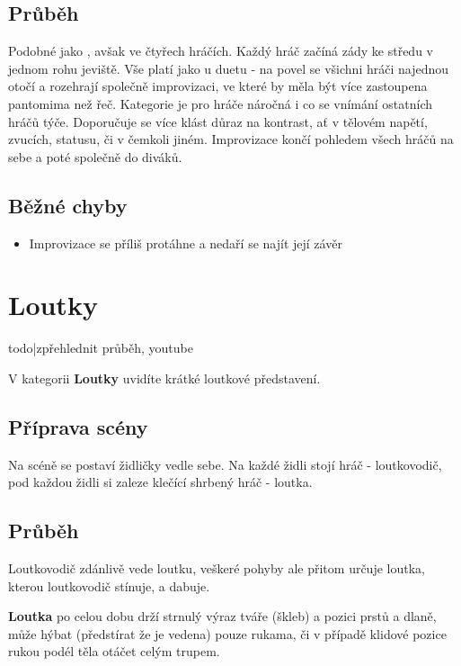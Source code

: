  
\subsection{Průběh}  
Podobné jako , avšak ve čtyřech hráčích. Každý hráč začíná zády ke středu v jednom rohu jeviště. Vše platí jako u duetu - na povel  se všichni hráči najednou otočí a rozehrají společně improvizaci, ve které by měla být více zastoupena pantomima než řeč. Kategorie je pro hráče náročná i co se vnímání ostatních hráčů týče. Doporučuje se více klást důraz na kontrast, ať v tělovém napětí, zvucích, statusu, či v čemkoli jiném. Improvizace končí pohledem všech hráčů na sebe a poté společně do diváků. 
 
\subsection{ Běžné chyby } \begin{itemize}
\item Improvizace se příliš protáhne a nedaří se najít její závěr
\end{itemize}
 
 
 
\needspace{5cm} \section{Loutky} \label{loutky} {{todo|zpřehlednit průběh, youtube}} 
 
 
V kategorii \textbf{Loutky}{}  uvidíte krátké loutkové představení. 
 
\subsection{Příprava scény} Na scéně se postaví židličky vedle sebe. Na každé židli stojí hráč - loutkovodič, pod každou židli si zaleze klečící shrbený hráč - loutka. 
 
\subsection{Průběh} Loutkovodič zdánlivě vede loutku, veškeré pohyby ale přitom určuje loutka, kterou loutkovodič stínuje, a dabuje. 
 
\textbf{Loutka}{} po celou dobu drží strnulý výraz tváře (škleb) a pozici prstů a dlaně, může hýbat (předstírat že je vedena) pouze rukama, či v případě klidové pozice rukou podél těla otáčet celým trupem. 
 
